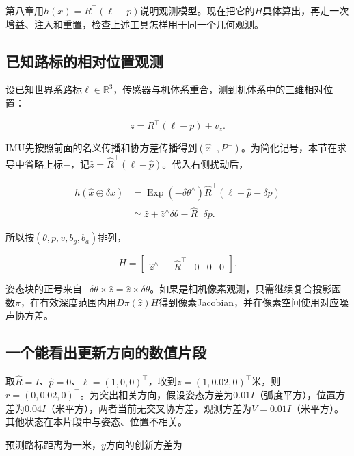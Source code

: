 第八章用$h(x)=R^\top(\ell-p)$说明观测模型。现在把它的$H$具体算出，再走一次增益、注入和重置，检查上述工具怎样用于同一个几何观测。

\subsection{已知路标的相对位置观测}

设已知世界系路标$\ell\in\mathbb R^3$，传感器与机体系重合，测到机体系中的三维相对位置：

\begin{equation*}
z=R^\top(\ell-p)+v_z.
\end{equation*}

IMU先按照前面的名义传播和协方差传播得到$(\hat x^-,P^-)$。为简化记号，本节在求导中省略上标$-$，记$\hat z=\hat R^\top(\ell-\hat p)$。代入右侧扰动后，

\begin{equation*}
\begin{aligned}
 h(\hat x\oplus\delta x)
 &=\mathop{\mathrm{Exp}}(-\delta\theta^\wedge)\hat R^\top
                      (\ell-\hat p-\delta p)\\
 &\simeq\hat z+\hat z^\wedge\delta\theta-\hat R^\top\delta p.
\end{aligned}
\end{equation*}

所以按$(\theta,p,v,b_g,b_a)$排列，

\begin{equation*}
\boxed{H=\begin{bmatrix}\hat z^\wedge&-\hat R^\top&0&0&0\end{bmatrix}.}
\end{equation*}

姿态块的正号来自$-\delta\theta\times\hat z=\hat z\times\delta\theta$。如果是相机像素观测，只需继续复合投影函数$\pi$，在有效深度范围内用$D\pi(\hat z)H$得到像素Jacobian，并在像素空间使用对应噪声协方差。

\subsection{一个能看出更新方向的数值片段}

取$\hat R=I$、$\hat p=0$、$\ell=(1,0,0)^\top$，收到$z=(1,0.02,0)^\top$米，则$r=(0,0.02,0)^\top$。为突出相关方向，假设姿态方差为$0.01I$（弧度平方），位置方差为$0.04I$（米平方），两者当前无交叉协方差，观测方差为$V=0.01I$（米平方）。其他状态在本片段中与姿态、位置不相关。

预测路标距离为一米，$y$方向的创新方差为

